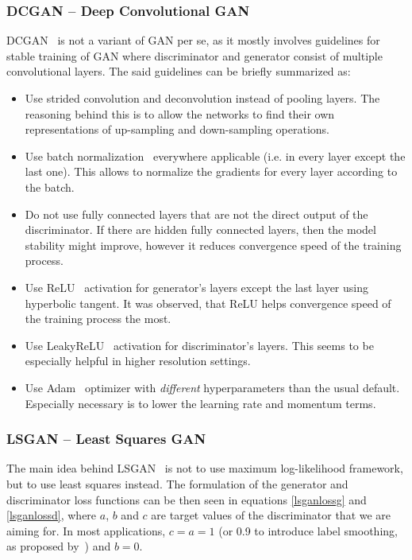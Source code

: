 \subsubsection{DCGAN -- Deep Convolutional GAN}
DCGAN~\cite{dcgan} is not a variant of GAN per se, as it mostly involves guidelines for stable training of GAN where discriminator and generator consist of multiple convolutional layers. The said guidelines can be briefly summarized as:
\begin{itemize}
\item Use strided convolution and deconvolution instead of pooling layers. The reasoning behind this is to allow the networks to find their own representations of up-sampling and down-sampling operations.
\item Use batch normalization~\cite{batchnorm} everywhere applicable (i.e. in every layer except the last one). This allows to normalize the gradients for every layer according to the batch.
\item Do not use fully connected layers that are not the direct output of the discriminator. If there are hidden fully connected layers, then the model stability might improve, however it reduces convergence speed of the training process.
\item Use ReLU~\cite{relu} activation for generator's layers except the last layer using hyperbolic tangent. It was observed, that ReLU helps convergence speed of the training process the most.
\item Use LeakyReLU~\cite{leakyrelu} activation for discriminator's layers. This seems to be especially helpful in higher resolution settings.
\item Use Adam~\cite{adam} optimizer with {\em different} hyperparameters than the usual default. Especially necessary is to lower the learning rate and momentum terms.
\end{itemize}

\subsubsection{LSGAN -- Least Squares GAN}
The main idea behind LSGAN~\cite{lsgan} is not to use maximum log-likelihood framework, but to use least squares instead. The formulation of the generator and discriminator loss functions can be then seen in equations \ref{lsganlossg} and \ref{lsganlossd}, where $a$, $b$ and $c$ are target values of the discriminator that we are aiming for. In most applications, $c = a = 1$ (or 0.9 to introduce label smoothing, as proposed by~\cite{improvedgan,smooth}) and $b = 0$.

